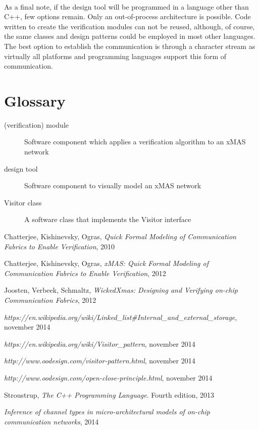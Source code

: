 \documentclass[a4paper,11pt]{article}
\begin{document}
\paragraph{}
As a final note, if the design tool will be programmed in a language other than
C++, few options remain. Only an out-of-process architecture is possible. Code
written to create the verification modules can not be reused, although, of course,
the same classes and design patterns could be employed in most other languages.
The best option to establish the communication is through a character stream as
virtually all platforms and programming languages support this form of
communication.



\section{Glossary}
\begin{description}
 \item[(verification) module] 	Software component which applies a verification algorithm to an xMAS network
 \item[design tool]		Software component to visually model an xMAS network
 \item[Visitor class]		A software class that implements the Visitor interface
\end{description}

\begin{thebibliography}{9}

  Chatterjee, Kishinevsky, Ogras,
  \emph{Quick Formal Modeling of Communication Fabrics to Enable Verification},
  2010
  
  Chatterjee, Kishinevsky, Ogras,
  \emph{xMAS: Quick Formal Modeling of Communication Fabrics to Enable Verification},
  2012
  
  Joosten, Verbeek, Schmaltz,
  \emph{WickedXmas: Designing and Verifying on-chip Communication Fabrics},
  2012
  
  
  \emph{https://en.wikipedia.org/wiki/Linked\_list\#Internal\_and\_external\_storage},
  november 2014
  
  \emph{https://en.wikipedia.org/wiki/Visitor\_pattern},
  november 2014

  \emph{http://www.oodesign.com/visitor-pattern.html},
  november 2014
  
  \emph{http://www.oodesign.com/open-close-principle.html},
  november 2014
  
  Stroustrup,
  \emph{The C++ Programming Language}.
  Fourth edition,
  2013
  
  \emph{Inference of channel types in micro-architectural models of on-chip communication networks},
  2014

  
  
  
\end{thebibliography}
\end{document}
